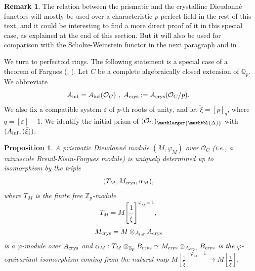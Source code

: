 \documentclass{amsart}
\newcommand{\prism}{{\mathlarger{\mathbbl{\Delta}}}}
\theoremstyle{plain}
\newtheorem{proposition}[theorem]{Proposition}
\theoremstyle{definition}
\newtheorem{remark}[theorem]{Remark}
\newcommand{\crys}{\mathrm{crys}}
\newcommand{\tilxi}{\tilde{\xi}}
\begin{document}
\begin{remark}
The relation between the prismatic and the crystalline Dieudonn\'e functors will mostly be used over a characteristic $p$ perfect field in the rest of this text, and it could be interesting to find a more direct proof of it in this special case, as explained at the end of this section. But it will also be used for comparison with the Scholze-Weinstein functor in the next paragraph and in . 
\end{remark}


We turn to perfectoid rings. The following statement is a special case of a theorem of Fargues (\cite{fargues_quelques_resultats_et_conjectures_concernant_la_courbe}, \cite{scholze2020berkeley}). Let $C$ be a complete algebraically closed extension of $\mathbb{Q}_p$. We abbreviate
$$
A_{\rm inf}=A_{\rm inf}(\mathcal{O}_C)\ ,\ A_\crys:=A_{\rm crys}(\mathcal{O}_C/p).
$$
We also fix a compatible system $\varepsilon$ of $p$-th roots of unity, and let $\tilxi=[p]_q$, where $q=[\varepsilon]-1$. We identify the initial prism of $(\mathcal{O}_C)_{\prism}$ with $(A_{\rm inf},(\tilxi))$.

\begin{proposition}
A prismatic Dieudonn\'e module $(M,\varphi_M)$ over $\mathcal{O}_C$ (i.e., a minuscule Breuil-Kisin-Fargues module) is uniquely determined up to isomorphism by the triple
\[ (T_M, M_{\rm crys}, \alpha_M), \]
where $T_M$ is the finite free $\mathbb{Z}_p$-module $$ T_M=M[\frac{1}{\tilxi}]^{\varphi_M=1},$$ $$M_{\rm crys}=M\otimes_{A_{\rm inf}} A_{\rm crys}$$ is a $\varphi$-module over $A_{\rm crys}$ and $\alpha_M : T_M \otimes_{\mathbb{Z}_p} B_{\rm crys} \simeq M_{\rm crys} \otimes_{A_{\rm crys}} B_{\rm crys}$ is the $\varphi$-equivariant isomorphism coming from the natural map $M[\frac{1}{\tilxi}]^{\varphi_M=1} \to M[\frac{1}{\tilxi}]$.
\end{proposition}
\end{document}
